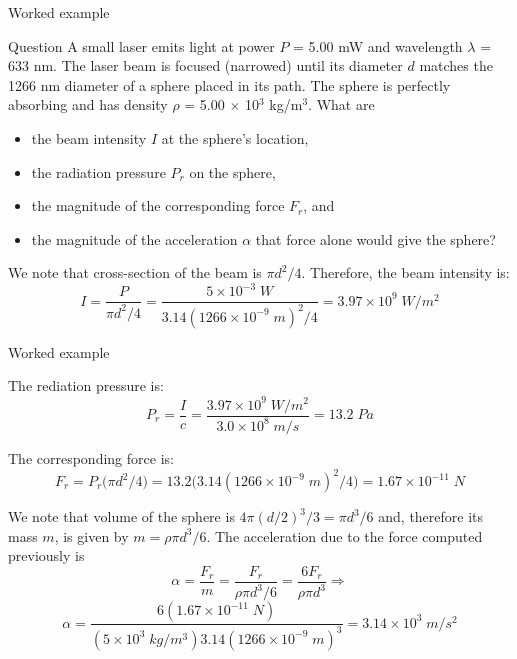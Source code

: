 {
\problemslide

\begin{frame}{Worked example}

\begin{blockexmplque}{Question}
  A small laser emits light at power $P$ = 5.00 mW and wavelength $\lambda$ = 633 nm.
  The laser beam is focused (narrowed) until its diameter $d$ matches the 1266 nm
  diameter of a sphere placed in its path. The sphere is perfectly absorbing
  and has density $\rho$ = 5.00 $\times$ 10$^3$ kg/m$^3$.
  What are
  \begin{itemize}
  \item the beam intensity $I$ at the sphere's location,
  \item the radiation pressure $P_r$ on the sphere,
  \item the magnitude of the corresponding force $F_r$, and
  \item the magnitude of the acceleration $\alpha$ that force alone would give the sphere?
  \end{itemize}
\end{blockexmplque}

We note that cross-section of the beam is $\pi d^2/4$.
Therefore, the beam intensity is:
\begin{equation*}
   I = \frac{P}{\pi d^2 / 4}
     = \frac{5 \times 10^{-3} \; W}{3.14 (1266 \times 10^{-9} \; m)^2 / 4 }
     = 3.97 \times 10^9 \; W/m^2
\end{equation*}

\end{frame}

%
%
%
%

\begin{frame}{Worked example}

The rediation pressure is:
\begin{equation*}
   P_r = \frac{I}{c}
       = \frac{3.97 \times 10^9 \; W/m^2}{3.0 \times 10^8 \; m/s}
       = 13.2 \; Pa
\end{equation*}

The corresponding force is:
\begin{equation*}
   F_r = P_r \Big( \pi d^2 / 4 \Big) 
       = 13.2 \Big(3.14 (1266 \times 10^{-9} \; m)^2 / 4 \Big)
       = 1.67 \times 10^{-11} \; N
\end{equation*}

We note that volume of the sphere is $4\pi(d/2)^3/3 = \pi d^3/6$ and,
therefore its mass $m$, is given by $m = \rho \pi d^3/6$.
The acceleration due to the force computed previously is
\begin{equation*}
   \alpha = \frac{F_r}{m} = \frac{F_r}{\rho \pi d^3/6} = \frac{6 F_r}{\rho \pi d^3} \Rightarrow
\end{equation*}
\begin{equation*}
   \alpha = \frac{6 (1.67 \times 10^{-11} \; N)}{(5 \times 10^3 \; kg/m^3) 3.14 (1266 \times 10^{-9} \; m)^3}
          = 3.14 \times 10^3 \; m/s^2
\end{equation*}

\end{frame}

} %


